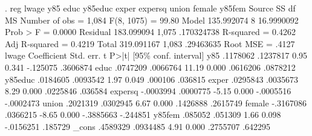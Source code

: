 . reg lwage y85 educ y85educ exper expersq union female y85fem
{\smallskip}
      Source {\VBAR}       SS           df       MS      Number of obs   =     1,084
   F(8, 1075)      =     99.80
       Model {\VBAR}  135.992074         8  16.9990092   Prob > F        =    0.0000
    Residual {\VBAR}  183.099094     1,075  .170324738   R-squared       =    0.4262
   Adj R-squared   =    0.4219
       Total {\VBAR}  319.091167     1,083   .29463635   Root MSE        =     .4127
{\smallskip}
       lwage {\VBAR} Coefficient  Std. err.      t    P>|t|     [95\% conf. interval]
         y85 {\VBAR}   .1178062   .1237817     0.95   0.341     -.125075    .3606874
        educ {\VBAR}   .0747209   .0066764    11.19   0.000     .0616206    .0878212
     y85educ {\VBAR}   .0184605   .0093542     1.97   0.049      .000106     .036815
       exper {\VBAR}   .0295843   .0035673     8.29   0.000     .0225846     .036584
     expersq {\VBAR}  -.0003994   .0000775    -5.15   0.000    -.0005516   -.0002473
       union {\VBAR}   .2021319   .0302945     6.67   0.000     .1426888    .2615749
      female {\VBAR}  -.3167086   .0366215    -8.65   0.000    -.3885663    -.244851
      y85fem {\VBAR}    .085052    .051309     1.66   0.098    -.0156251     .185729
       _cons {\VBAR}   .4589329   .0934485     4.91   0.000     .2755707     .642295
{\smallskip}
